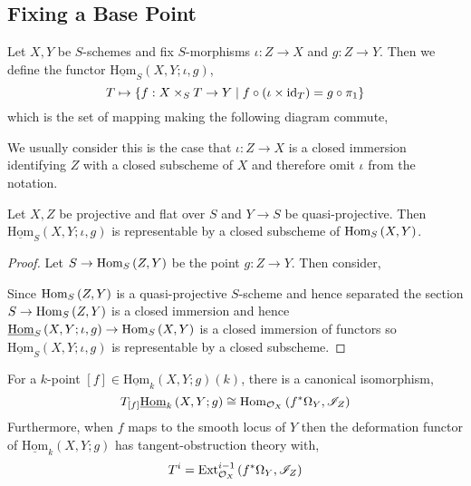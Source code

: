\documentclass[12pt]{article}
\newcommand{\ufixHom}[4]{\underline{\mathrm{Hom}}_{#1} \left( #2, #3 ; #4 \right)}
\begin{document}
\subsection{Fixing a Base Point}

\begin{defn}
Let $X, Y$ be $S$-schemes and fix $S$-morphisms $\iota : Z \to X$ and $g : Z \to Y$. Then we define the functor $\ufixHom{S}{X}{Y}{\iota, g}$,
\[ T \mapsto \{ f : X \times_S T \to Y \mid f \circ (\iota \times \mathrm{id}_T) = g \circ \pi_1\} \]
which is the set of mapping making the following diagram commute,
\begin{center}
\end{center}
\end{defn}

\begin{rmk}
We usually consider this is the case that $\iota : Z \to X$ is a closed immersion identifying $Z$ with a closed subscheme of $X$ and therefore omit $\iota$ from the notation.
\end{rmk}

\begin{prop}
Let $X, Z$ be projective and flat over $S$ and $Y \to S$ be quasi-projective. Then $\ufixHom{S}{X}{Y}{\iota, g}$ is representable by a closed subscheme of $\mathrm{Hom}_{S} \left( X, Y \right)$.
\end{prop}

\begin{proof}
Let $S \to \mathrm{Hom}_{S} \left( Z, Y \right)$ be the point $g : Z \to Y$. Then consider,
\begin{center}
\end{center}
Since $\mathrm{Hom}_{S} \left( Z, Y \right)$ is a quasi-projective $S$-scheme and hence separated the section $S \to \mathrm{Hom}_{S} \left( Z, Y \right)$ is a closed immersion and hence $\ufixHom{S}{X}{Y}{\iota,g} \to \Hom{S}{X}{Y}$ is a closed immersion of functors so $\ufixHom{S}{X}{Y}{\iota,g}$ is representable by a closed subscheme.
\end{proof}

\begin{prop}
For a $k$-point $[f] \in \ufixHom{k}{X}{Y}{g}(k)$, there is a canonical isomorphism,
\[ T_{[f]} \ufixHom{k}{X}{Y}{g} \cong \Hom{\struct{X}}{f^* \Omega_{Y}}{\I_Z} \]
Furthermore, when $f$ maps to the smooth locus of $Y$ then the deformation functor of $\ufixHom{k}{X}{Y}{g}$ has tangent-obstruction theory with,
\[ T^i = \mathrm{Ext}^{i-1}_{\mathcal{O}_{X}} \left( f^* \Omega_{Y}, \mathscr{I}_Z \right) \]
\end{prop}
\end{document}
